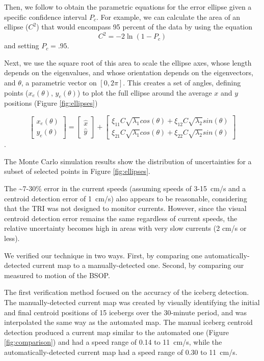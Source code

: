 Then, we follow \citet{haug2012bayesian} to obtain the parametric equations for the error ellipse given a specific confidence interval $P_c$. For example, we can calculate the area of an ellipse ($C^2$) that would encompass 95 percent of the data by using the equation 
\begin{equation}
 C^2=-2\ln(1-P_c)
\end{equation}
and setting $P_c=.95$.


Next, we use the square root of this area to scale the ellipse axes, whose length depends on the eigenvalues, and whose orientation depends on the eigenvectors, and $\theta$, a parametric vector on $[0,2\pi]$. This creates a set of angles, defining points ($x_e (\theta)$, $y_e (\theta)$) to plot the full ellipse around the average $x$ and $y$ positions (Figure \ref{fig:ellipses}) 

\begin{equation}
\left[
\begin{array}{c}
x_e (\theta) \\ y_e (\theta)
\end{array}
\right]
=
\left[
\begin{array}{c}
\hat{x} \\ \hat{y}
\end{array}
\right]
+
\left[
\begin{array}{c}
\xi_{11}C\sqrt{\lambda_1}cos(\theta)+ \xi_{12}C\sqrt{\lambda_2}sin(\theta) 
\\ 
\xi_{21}C\sqrt{\lambda_1}cos(\theta)+ \xi_{22}C\sqrt{\lambda_2}sin(\theta)
\end{array}
\right]
\end{equation}
.

The Monte Carlo simulation results show the distribution of uncertainties for a subset of selected points in Figure \ref{fig:ellipses}.

The \textasciitilde7-30\% error in the current speeds (assuming speeds of 3-15~cm/s and a centroid detection error of 1~cm/s) also appears to be reasonable, considering that the TRI was not designed to monitor currents. However, since the visual centroid detection error remains the same regardless of current speeds, the relative uncertainty becomes high in areas with very slow currents (2 cm/s or less).

We verified our technique in two ways. First, by comparing one automatically-detected current map to a manually-detected one. Second, by comparing our measured to motion of the BSOP.

The first verification method focused on the accuracy of the iceberg detection. The manually-detected current map was created by visually identifying the initial and final centroid positions of 15 icebergs over the 30-minute period, and was interpolated the same way as the automated map. The manual iceberg centroid detection produced a current map similar to the automated one (Figure \ref{fig:comparison}) and had a speed range of 0.14 to 11~cm/s, while the automatically-detected current map had a speed range of 0.30 to 11~cm/s. 

